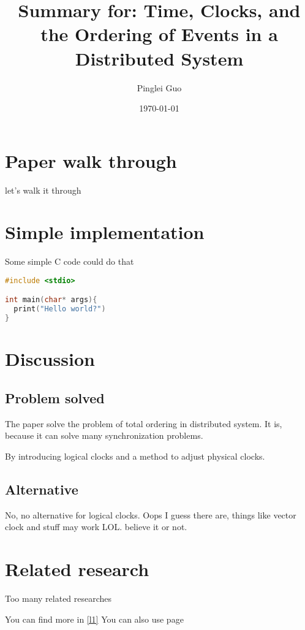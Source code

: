 \documentclass[12pt,a4paper,oneside]{article}
\title{Summary for: Time, Clocks, and the Ordering of Events in a Distributed System}
\author{Pinglei Guo}
\date{\today}
\begin{document}
\maketitle

\section{Paper walk through}

let's walk it through

\section{Simple implementation}

Some simple C code could do that

\begin{lstlisting}[language=C]
#include <stdio>

int main(char* args){
  print("Hello world?")
}
\end{lstlisting}

\section{Discussion}

\subsection{Problem solved}

The paper solve the problem of total ordering in distributed system.
It is, because it can solve many synchronization problems.

By introducing logical clocks and a method to adjust physical clocks.

\subsection{Alternative}

No, no alternative for logical clocks. Oops I guess there are, things
like vector clock and stuff may work LOL. believe it or not.

\section{Related research}


Too many related researches

You can find more in \ref{l1}
You can also use page \pageref{l1}
\end{document}
